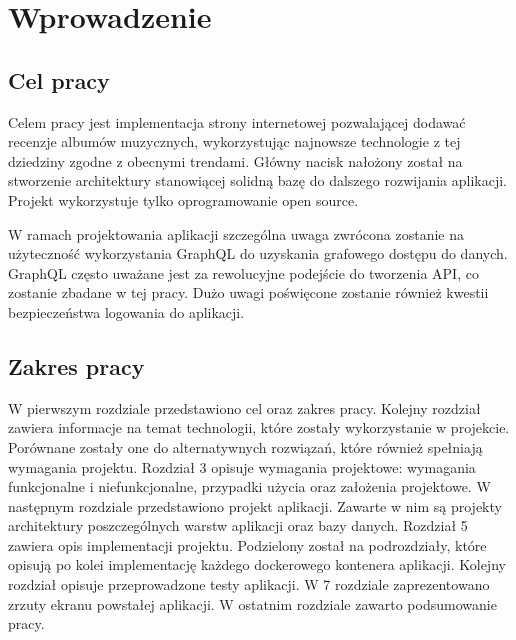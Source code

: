 \chapter{Wprowadzenie}
\label{sec:wprowadzenie}

\section{Cel pracy}
	Celem pracy jest implementacja strony internetowej pozwalającej dodawać recenzje albumów muzycznych,
	wykorzystując najnowsze technologie z tej dziedziny zgodne z obecnymi trendami.
	Główny nacisk nałożony został na stworzenie architektury stanowiącej solidną bazę do dalszego rozwijania aplikacji.
	Projekt wykorzystuje tylko oprogramowanie open source.

	W ramach projektowania aplikacji szczególna uwaga zwrócona zostanie na użyteczność wykorzystania GraphQL do uzyskania grafowego dostępu do danych.
	GraphQL często uważane jest za rewolucyjne podejście do tworzenia API, co zostanie zbadane w tej pracy.
	Dużo uwagi poświęcone zostanie również kwestii bezpieczeństwa logowania do aplikacji.

\section{Zakres pracy}
	W pierwszym rozdziale przedstawiono cel oraz zakres pracy.
	Kolejny rozdział zawiera informacje na temat technologii, które zostały wykorzystanie w projekcie.
	Porównane zostały one do alternatywnych rozwiązań, które również spełniają wymagania projektu.
	Rozdział 3 opisuje wymagania projektowe: wymagania funkcjonalne i niefunkcjonalne, przypadki użycia oraz założenia projektowe.
	W następnym rozdziale przedstawiono projekt aplikacji.
	Zawarte w nim są projekty architektury poszczególnych warstw aplikacji oraz bazy danych.
	Rozdział 5 zawiera opis implementacji projektu.
	Podzielony został na podrozdziały, które opisują po kolei implementację każdego dockerowego kontenera aplikacji.
	Kolejny rozdział opisuje przeprowadzone testy aplikacji.
	W 7 rozdziale zaprezentowano zrzuty ekranu powstałej aplikacji.
	W ostatnim rozdziale zawarto podsumowanie pracy.
